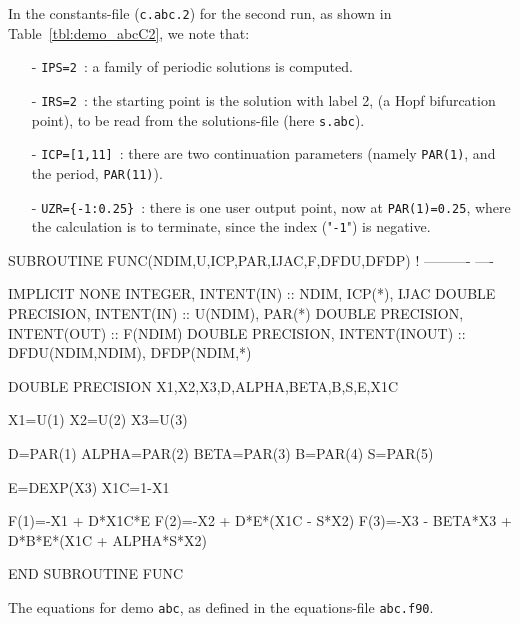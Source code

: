 \documentclass[12pt]{report}
\begin{document}
In the constants-file ({\tt c.abc.2}) for the second run, as shown in 
Table~\ref{tbl:demo_abcC2}, we note that:

\begin{itemize}
\item[-] {\tt IPS=2}~: a family of periodic solutions is computed.

\item[-] {\tt IRS=2}~: the starting point is the solution with label 2,
         (a Hopf bifurcation point), to be read from the solutions-file 
	 (here {\tt s.abc}).

\item[-] {\tt ICP=[1,11]}~: there are two continuation parameters
	 (namely {\tt PAR(1)}, and the period, {\tt PAR(11)}). 

\item[-] {\tt UZR=\{-1:0.25\}}~: there is one user output point, now at
	 {\tt PAR(1)=0.25}, where the calculation is to terminate,
	 since the index ("{\tt -1}") is negative.
\end{itemize}

\begin{table}[htbp]
{\small
\begin{center}
\begin{boxedverbatim}
      SUBROUTINE FUNC(NDIM,U,ICP,PAR,IJAC,F,DFDU,DFDP) 
!     ---------- ---- 

      IMPLICIT NONE
      INTEGER, INTENT(IN) :: NDIM, ICP(*), IJAC
      DOUBLE PRECISION, INTENT(IN) :: U(NDIM), PAR(*)
      DOUBLE PRECISION, INTENT(OUT) :: F(NDIM)
      DOUBLE PRECISION, INTENT(INOUT) :: DFDU(NDIM,NDIM), DFDP(NDIM,*)

      DOUBLE PRECISION X1,X2,X3,D,ALPHA,BETA,B,S,E,X1C

       X1=U(1)
       X2=U(2)
       X3=U(3)

       D=PAR(1)
       ALPHA=PAR(2)
       BETA=PAR(3)
       B=PAR(4)
       S=PAR(5)

       E=DEXP(X3)
       X1C=1-X1

       F(1)=-X1 + D*X1C*E
       F(2)=-X2 + D*E*(X1C - S*X2)
       F(3)=-X3 - BETA*X3 + D*B*E*(X1C + ALPHA*S*X2)

      END SUBROUTINE FUNC
\end{boxedverbatim}
\end{center}
}
\caption{The equations for demo {\tt abc}, 
as defined in the equations-file {\tt abc.f90}.}
\label{tbl:demo_abcE1}
\end{table}
\end{document}
